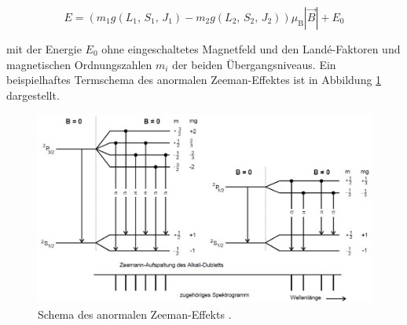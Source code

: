 \vspace{-15pt}
\begin{equation}
    E = (m_1 g(L_1,\, S_1,\, J_1) - m_2 g(L_2,\, S_2,\, J_2)) \mu_\text{B} |\vec{B}| + E_0
    \label{eqn:anorm}
\end{equation}

mit der Energie $E_0$ ohne eingeschaltetes Magnetfeld und den Landé-Faktoren und magnetischen
Ordnungszahlen $m_i$ der beiden Übergangsniveaus. Ein beispielhaftes Termschema des
anormalen Zeeman-Effektes ist in Abbildung \ref{fig:anorm} dargestellt.

\begin{figure}[H]
    \centering
    \includegraphics[scale=0.4]{content/anormalerzeeman.png}
    \caption{Schema des anormalen Zeeman-Effekts \cite{alt}.}
    \label{fig:anorm}
\end{figure}

















